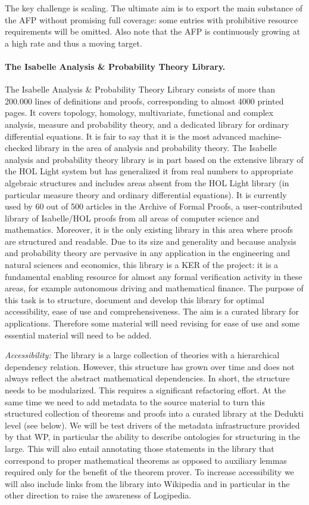 The key challenge is scaling. The ultimate aim is to export the main
substance of the AFP without promising full coverage: some entries
with prohibitive resource requirements will be omitted. Also note that
the AFP is continuously growing at a high rate and thus a moving
target.

\paragraph*{The Isabelle Analysis \& Probability Theory Library.}
The Isabelle Analysis \& Probability Theory Library consists of more
than 200.000 lines of definitions and proofs, corresponding to almost
4000 printed pages. It covers topology, homology, multivariate,
functional and complex analysis, measure and probability theory, and a
dedicated library for ordinary differential equations. It is fair to
say that it is the most advanced machine-checked library in the area
of analysis and probability theory. The Isabelle analysis and
probability theory library is in part based on the extensive library
of the HOL Light system but has generalized it from real numbers to
appropriate algebraic structures and includes areas absent from the
HOL Light library (in particular measure theory and ordinary
differential equations). It is currently used by 60 out of 500
articles in the Archive of Formal Proofs, a user-contributed library
of Isabelle/HOL proofs from all areas of computer science and
mathematics. Moreover, it is the only existing library in this area
where proofs are structured and readable. Due to its size and
generality and because analysis and probability theory are pervasive
in any application in the engineering and natural sciences and
economics, this library is a KER of the project: it is a fundamental
enabling resource for almost any formal verification activity in these
areas, for example autonomous driving and mathematical finance. The
purpose of this task is to structure, document and develop this
library for optimal accessibility, ease of use and
comprehensiveness. The aim is a curated library for applications.
Therefore some material will need revising for ease of use and some
essential material will need to be added.

\emph{Accessibility:}
The library is a large collection of theories with a hierarchical dependency
relation. However, this structure has grown over time and does not always
reflect the abstract mathematical dependencies. In short, the structure needs
to be modularized. This requires a significant refactoring effort.
%
At the same time we need to add metadata to the source material to turn this
structured collection of theorems and proofs into a curated library at the
Dedukti level (see below). We
will be test drivers of the metadata infrastructure provided by that WP, in
particular the ability to describe ontologies for structuring in the large.
This will also entail annotating those statements in the library that
correspond to proper mathematical theorems as opposed to auxiliary lemmas
required only for the benefit of the theorem prover.
To increase accessibility we will also include links from the library into
Wikipedia and in particular in the other direction to raise the awareness
of Logipedia.

